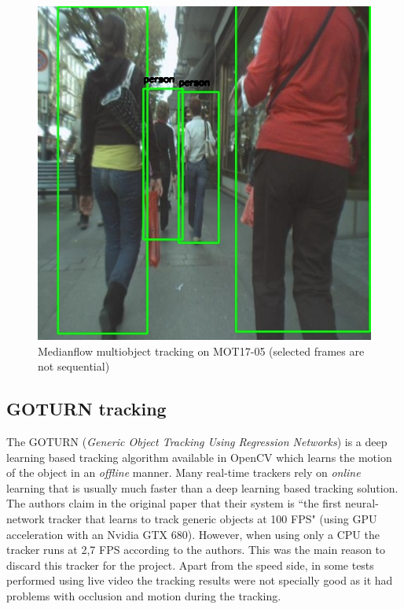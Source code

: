 \begin{figure}[H]
\begin{center}
\includegraphics[scale=0.25]{figures/659.jpg}
\caption{Medianflow multiobject tracking on MOT17-05 (selected frames are not sequential)}
\label{fig:medianflow_images}
\end{center}
\end{figure}
\subsection{GOTURN tracking}
The GOTURN (\textit{Generic Object Tracking Using Regression Networks}) is a deep learning based tracking algorithm available in OpenCV which learns the motion of the object in an \textit{offline} manner. Many real-time trackers rely on \textit{online} learning that is usually much faster than a deep learning based tracking solution. The authors claim in the original paper \cite{held2016learning} that their system is ``the first neural-network tracker that learns to track generic objects at 100 FPS" (using GPU acceleration with an Nvidia GTX 680). However, when using only a CPU the tracker runs at 2,7 FPS according to the authors. This was the main reason to discard this tracker for the project. Apart from the speed side, in some tests performed using live video the tracking results were not specially good as it had problems with occlusion and motion during the tracking.
\\ \ \\ \ \\ \ \\
